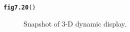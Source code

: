 \documentclass[12pt, a4paper,  BCOR=8.25mm, DIV=15]{scrartcl}\usepackage[]{graphicx}\usepackage[]{color}
\makeatletter
\newcommand{\hlstd}[1]{\textcolor[rgb]{0.345,0.345,0.345}{#1}}%
\newcommand{\hlkwd}[1]{\textcolor[rgb]{0.737,0.353,0.396}{\textbf{#1}}}%
\newenvironment{kframe}{%
 \def\at@end@of@kframe{}%
 \ifinner\ifhmode%
  \def\at@end@of@kframe{\end{minipage}}%
  \begin{minipage}{\columnwidth}%
 \fi\fi%
 \def\FrameCommand##1{\hskip\@totalleftmargin \hskip-\fboxsep
 \colorbox{shadecolor}{##1}\hskip-\fboxsep
     \hskip-\linewidth \hskip-\@totalleftmargin \hskip\columnwidth}%
 \MakeFramed {\advance\hsize-\width
   \@totalleftmargin\z@ \linewidth\hsize
   \@setminipage}}%
 {\par\unskip\endMakeFramed%
 \at@end@of@kframe}
\newenvironment{knitrout}{}{} %
\makeatother
\begin{document}
\begin{knitrout}
\color{fgcolor}\begin{kframe}
\begin{alltt}
\hlkwd{fig7.20}\hlstd{()}
\end{alltt}
\end{kframe}
\end{knitrout}

\begin{figure}

\caption{Snapshot of 3-D dynamic display.}\label{fig:rgl-ex}
\end{figure}
\end{document}
